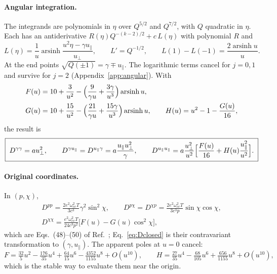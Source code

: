 \documentclass[11pt,a4paper]{article}
\numberwithin{equation}{section}
\newcommand{\upar}{u_\parallel}
\newcommand{\uperp}{u_\perp}
\newcommand{\arsinh}{\operatorname{arsinh}}
\begin{document}
\paragraph{Angular integration.} The integrands are polynomials in $\eta$
over $Q^{5/2}$ and $Q^{7/2}$, with $Q$ quadratic in $\eta$. Each has an
antiderivative $R(\eta)Q^{-(k-2)/2}+c\,L(\eta)$ with polynomial $R$ and
\begin{equation}
L(\eta)=\frac1u\arsinh\frac{u^2\eta-\gamma\upar}{\uperp},\qquad L'=Q^{-1/2},\qquad L(1)-L(-1)=\frac{2\arsinh u}{u} .
\end{equation}
At the end points $\sqrt{Q(\pm1)}=\gamma\mp\upar$. The logarithmic terms cancel
for $j=0,1$ and survive for $j=2$ (Appendix~\ref{app:angular}). With
\begin{align}
F(u)&=10+\frac{3}{u^2}-\Bigl(\frac{9}{\gamma u}+\frac{3\gamma}{u^3}\Bigr)\arsinh u,\\
G(u)&=10+\frac{15}{u^2}-\Bigl(\frac{21}{\gamma u}+\frac{15\gamma}{u^3}\Bigr)\arsinh u,\qquad
H(u)=u^2-1-\frac{G(u)}{16},
\end{align}
the result is
\begin{equation}
\boxed{\;D^{\gamma\gamma}=a\uperp^2,\qquad
D^{\gamma\upar}=D^{\upar\gamma}=a\frac{\upar\uperp^2}{\gamma},\qquad
D^{\upar\upar}=a\frac{\uperp^2}{u^2}\Bigl[\frac{F(u)}{16}+H(u)\frac{\upar^2}{u^2}\Bigr].\;}
\label{eq:Dclosed}
\end{equation}

\paragraph{Original coordinates.} In $(p,\chi)$,
\begin{gather}
D^{pp}=\frac{2e^2\omega_{ce}^2T}{3c^3}\gamma^2\sin^2\chi,\qquad
D^{p\chi}=D^{\chi p}=\frac{2e^2\omega_{ce}^2T}{3c^3p}\sin\chi\cos\chi,\\
D^{\chi\chi}=\frac{e^2\omega_{ce}^2T}{24c^3p^2}\bigl[F(u)-G(u)\cos^2\chi\bigr],
\end{gather}
which are Eqs.~(48)--(50) of Ref.~\cite{KK96}; Eq.~\eqref{eq:Dclosed} is their
contravariant transformation to $(\gamma,\upar)$. The apparent poles at $u=0$
cancel:
\begin{equation}
F=\tfrac{32}{5}u^2-\tfrac{176}{35}u^4+\tfrac{64}{15}u^6-\tfrac{4352}{1155}u^8+O(u^{10}),\qquad
H=\tfrac{27}{35}u^4-\tfrac{68}{105}u^6+\tfrac{656}{1155}u^8+O(u^{10}),
\label{eq:FHseries}
\end{equation}
which is the stable way to evaluate them near the origin.
\end{document}
